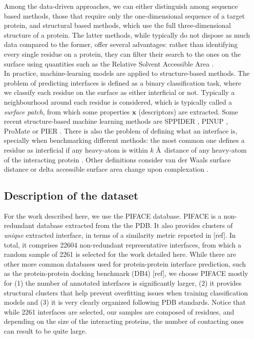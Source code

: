 \documentclass[10pt,a4paper,twoside]{book}
\begin{document}
Among the data-driven approaches, we can either distinguish among sequence based methods, those that require only the one-dimensional sequence of a target protein, and structural based methods, which use the full three-dimensional structure of a protein. The latter methods, while typically do not dispose as much data compared to the former, offer several advantages: rather than identifying every single residue on a protein, they can filter their search to the ones on the surface using quantities such as the Relative Solvent Accessible Area \cite{Tien2013}.\\

In practice, machine-learning models are applied to structure-based methods. The problem of predicting interfaces is defined as a binary classification task, where we classify each residue on the surface as either interficial or not. Typically a neighbourhood around each residue is considered, which is typically called a \textit{surface patch}, from which some properties $\boldsymbol{x}$ (descriptors) are extracted. Some recent structure-based machine learning methods are SPPIDER \cite{Porollo2007}, PINUP \cite{Liang2006}, ProMate \cite{Neuvirth2004} or PIER \cite{Kufareva2007}. There is also the problem of defining what an interface is, specially when benchmarking different methods: the most common one defines a residue as interficial if any heavy-atom is within $k$ \AA\ distance of any heavy-atom of the interacting protein \cite{AfsarMinhas2014}. Other definitions consider van der Waals surface distance \cite{Jordan2012} or delta accessible surface area change upon complexation \cite{Jones1997}.

\subsection{Description of the dataset}

For the work described here, we use the PIFACE \cite{Cukuroglu2014} database. PIFACE is a non-redundant database extracted from the the PDB. It also provides clusters of \textit{unique} extracted interface, in terms of a similarity metric reported in [ref]. In total, it comprises 22604 non-redundant representative interfaces, from which a random sample of 2261 is selected for the work detailed here. While there are other more common databases used for protein-protein interface prediction, such as the protein-protein docking benchmark (DB4) [ref], we choose PIFACE mostly for (1) the number of annotated interfaces is significantly larger, (2) it provides structural clusters that help prevent overfitting issues when training classification models and (3) it is very clearly organized following PDB standards. Notice that while 2261 interfaces are selected, our samples are composed of residues, and depending on the size of the interacting proteins, the number of contacting ones can result to be quite large.\\
\end{document}
